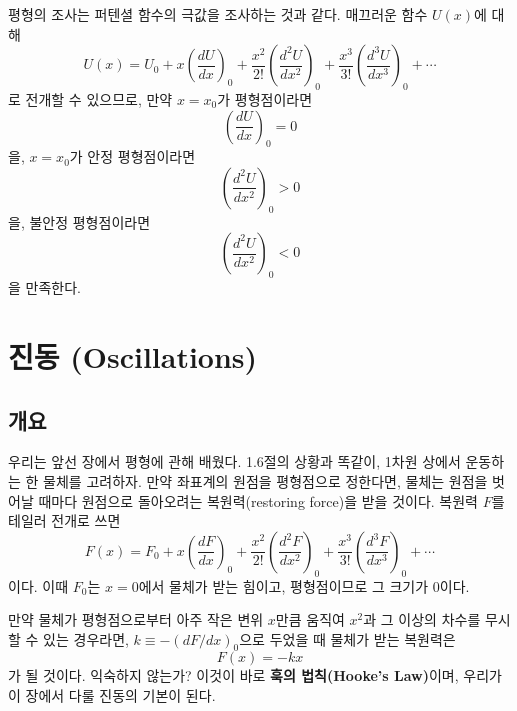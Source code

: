 \documentclass[chapter, oneside, b5paper]{oblivoir}
\theoremstyle{plain}
\theoremstyle{definition}
\theoremstyle{remark}
\begin{document}
평형의 조사는 퍼텐셜 함수의 극값을 조사하는 것과 같다. 매끄러운 함수 $U(x)$에 대해
\begin{equation}
    U(x) = U_0 + x \left(\frac{dU}{dx} \right)_0 + \frac{x^2}{2!} \left(\frac{d^2U}{dx^2} \right)_0 + \frac{x^3}{3!} \left(\frac{d^3U}{dx^3} \right)_0 + \cdots \label{eq:1.32}
\end{equation}
로 전개할 수 있으므로, 만약 $x=x_0$가 평형점이라면
\begin{equation}
    \left(\frac{dU}{dx} \right)_0 = 0 \label{eq:1.33}
\end{equation}
을, $x=x_0$가 안정 평형점이라면
\begin{equation}
    \left(\frac{d^2U}{dx^2} \right)_0 > 0 \label{eq:1.34}
\end{equation}
을, 불안정 평형점이라면
\begin{equation}
    \left(\frac{d^2U}{dx^2} \right)_0 < 0 \label{eq:1.35}
\end{equation}
을 만족한다.

\newpage
\chapter{진동 (Oscillations)}

\section{개요}
우리는 앞선 장에서 평형에 관해 배웠다. 1.6절의 상황과 똑같이, 1차원 상에서 운동하는 한 물체를 고려하자. 만약 좌표계의 원점을 평형점으로 정한다면, 물체는 원점을 벗어날 때마다 원점으로 돌아오려는 복원력(restoring force)을 받을 것이다. 복원력 $F$를 테일러 전개로 쓰면
\begin{equation}
    F(x) = F_0 + x \left(\frac{dF}{dx} \right)_0 + \frac{x^2}{2!} \left(\frac{d^2F}{dx^2} \right)_0 + \frac{x^3}{3!} \left(\frac{d^3F}{dx^3} \right)_0 + \cdots \label{eq:2.1}
\end{equation}
이다. 이때 $F_0$는 $x=0$에서 물체가 받는 힘이고, 평형점이므로 그 크기가 0이다.

만약 물체가 평형점으로부터 아주 작은 변위 $x$만큼 움직여 $x^2$과 그 이상의 차수를 무시할 수 있는 경우라면, $k \equiv -(dF/dx)_0$으로 두었을 때 물체가 받는 복원력은
\begin{equation}
    F(x) = -kx \label{eq:2.2}
\end{equation}
가 될 것이다. 익숙하지 않는가? 이것이 바로 \textbf{훅의 법칙(Hooke's Law)}이며, 우리가 이 장에서 다룰 진동의 기본이 된다.
\end{document}
